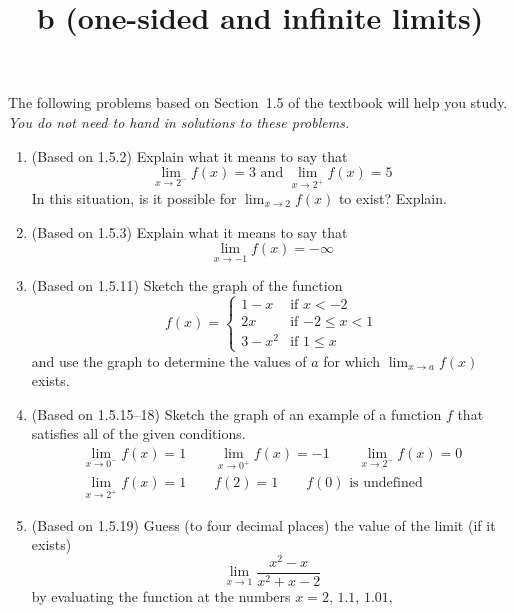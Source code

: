 \documentclass{article}
\title{\commonPSTitleZeroOneFive b (one-sided and infinite limits)}
\author{\commonAuthor}
\date{\commonDateZeroOneFive}
\newcommand{\ds}{\displaystyle}
\begin{document}
\maketitle
\thispagestyle{empty}

\noindent
The following problems based on Section~1.5 of the textbook will help
you study.  \emph{You do not need to hand in solutions to these
  problems.}
\begin{enumerate}
\item (Based on 1.5.2) %
  Explain what it means to say that
  \begin{equation*}
    \mbox{$\ds \lim_{x\to 2^-} f(x) = 3$ and $\ds \lim_{x\to 2^+} f(x) = 5$}
  \end{equation*}
  In this situation, is it possible for $\ds \lim_{x\to 2} f(x)$ to
  exist?  Explain.  
\item (Based on 1.5.3) %
  Explain what it means to say that 
  \begin{equation*}
    \lim_{x\to -1} f(x) = -\infty
  \end{equation*}
\item (Based on 1.5.11) %
  Sketch the graph of the function
  \begin{equation*}
    f(x) = \begin{cases}
      1-x   & \mbox{if $x<-2$} \\
      2x    & \mbox{if $-2\le x < 1$} \\
      3-x^2 & \mbox{if $1\le x$}
    \end{cases}
  \end{equation*}
  and use the graph to determine the values of $a$ for which $\ds
  \lim_{x\to a} f(x)$ exists.
\item (Based on 1.5.15--18) %
  Sketch the graph of an example of a function $f$ that satisfies
  all of the given conditions.
  \begin{gather*}
    \lim_{x\to 0^-} f(x) = 1
    \qquad
    \lim_{x\to 0^+} f(x) = -1
    \qquad
    \lim_{x\to 2^-} f(x) = 0
    \\
    \lim_{x\to 2^+} f(x) = 1
    \qquad
    f(2) = 1
    \qquad
    \mbox{$f(0)$ is undefined}
  \end{gather*}
\item (Based on 1.5.19) %
  Guess (to four decimal places) the value of the limit (if it exists)
  \begin{equation*}
    \lim_{x\to 1} \frac{x^2-x}{x^2+x-2}
  \end{equation*}
  by evaluating the function at the numbers $x=2$, $1.1$, $1.01$,

\end{enumerate}
\end{document}
